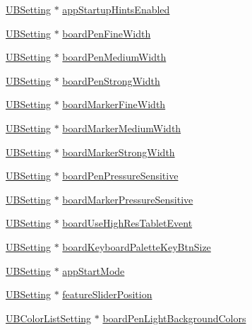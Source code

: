 \begin{DoxyCompactItemize}
\item 
\hyperlink{class_u_b_setting}{U\-B\-Setting} $\ast$ \hyperlink{class_u_b_settings_adf80724a5b19f7164a194113d40b8e1f}{app\-Startup\-Hints\-Enabled}
\item 
\hyperlink{class_u_b_setting}{U\-B\-Setting} $\ast$ \hyperlink{class_u_b_settings_a05a5a33384a6406c8e4185e224458877}{board\-Pen\-Fine\-Width}
\item 
\hyperlink{class_u_b_setting}{U\-B\-Setting} $\ast$ \hyperlink{class_u_b_settings_a56812af7a16f6ad2bf07ffebe2af7aba}{board\-Pen\-Medium\-Width}
\item 
\hyperlink{class_u_b_setting}{U\-B\-Setting} $\ast$ \hyperlink{class_u_b_settings_aa1d3e7cc36f9e9f5391b8149edc5ef8d}{board\-Pen\-Strong\-Width}
\item 
\hyperlink{class_u_b_setting}{U\-B\-Setting} $\ast$ \hyperlink{class_u_b_settings_a0985f0662d9606ddb12d889d401111f7}{board\-Marker\-Fine\-Width}
\item 
\hyperlink{class_u_b_setting}{U\-B\-Setting} $\ast$ \hyperlink{class_u_b_settings_a4f8e7aa90ecb8c2c45118961ad182063}{board\-Marker\-Medium\-Width}
\item 
\hyperlink{class_u_b_setting}{U\-B\-Setting} $\ast$ \hyperlink{class_u_b_settings_a912e41e00b9eecee7f098c44f52713a4}{board\-Marker\-Strong\-Width}
\item 
\hyperlink{class_u_b_setting}{U\-B\-Setting} $\ast$ \hyperlink{class_u_b_settings_a9d839d72ab401185bb7cd41ee27a7823}{board\-Pen\-Pressure\-Sensitive}
\item 
\hyperlink{class_u_b_setting}{U\-B\-Setting} $\ast$ \hyperlink{class_u_b_settings_a661e9108d58aa9374decbbd60ee9dbe4}{board\-Marker\-Pressure\-Sensitive}
\item 
\hyperlink{class_u_b_setting}{U\-B\-Setting} $\ast$ \hyperlink{class_u_b_settings_a26882941f5a5ba68576e09f815b1b6a6}{board\-Use\-High\-Res\-Tablet\-Event}
\item 
\hyperlink{class_u_b_setting}{U\-B\-Setting} $\ast$ \hyperlink{class_u_b_settings_a56680561172b80d4f577be8a5829db10}{board\-Keyboard\-Palette\-Key\-Btn\-Size}
\item 
\hyperlink{class_u_b_setting}{U\-B\-Setting} $\ast$ \hyperlink{class_u_b_settings_a0f7efdf202b7e78bd7580fc02aeed079}{app\-Start\-Mode}
\item 
\hyperlink{class_u_b_setting}{U\-B\-Setting} $\ast$ \hyperlink{class_u_b_settings_a85902693456aab2bf8f565f4198aeaa6}{feature\-Slider\-Position}
\item 
\hyperlink{class_u_b_color_list_setting}{U\-B\-Color\-List\-Setting} $\ast$ \hyperlink{class_u_b_settings_afe36b37ed64b4ce64c263e1ab0b32541}{board\-Pen\-Light\-Background\-Colors}

\end{DoxyCompactItemize}
